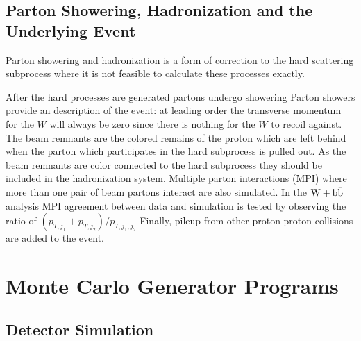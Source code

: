 \subsection{Parton Showering, Hadronization and the Underlying Event}

Parton showering and hadronization is a form of correction to the hard scattering subprocess
where it is not feasible to calculate these processes exactly.

After the hard processes are generated
partons undergo showering 
Parton showers provide an %
description of the event: at leading order the transverse momentum
for the $W$ will always be zero since there is nothing for the $W$
to recoil against.
The beam remnants are the colored remains of the proton which
are left behind when the parton which participates in the hard subprocess
is pulled out. As the beam remnants are color connected to the hard
subprocess they should be included in the hadronization system. 
Multiple parton interactions (MPI) where more than one pair
of beam partons interact are also simulated. In the $\mathrm{W+\mathrm{b\bar{b}}}$ analysis
MPI agreement between data and simulation is tested 
by observing the ratio of $(p_{T,j_{1}}+p_{T,j_{2}})/p_{T,j_{1},j_{2}}$
Finally, pileup from other proton-proton collisions are added to the event.
\section{Monte Carlo Generator Programs}


\subsection{Detector Simulation}

